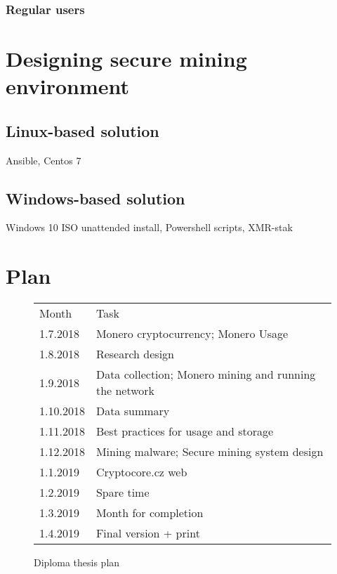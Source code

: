 \documentclass[
  printed, %
  table,   %
  nolof,     %
  nolot,     %
           oneside, color
]{fithesis3}
\begin{document}
\subsection{Regular users}


\chapter{Designing secure mining environment}
\section{Linux-based solution}
Ansible, Centos 7
\section{Windows-based solution}
Windows 10 ISO unattended install, Powershell scripts, XMR-stak

\chapter{Plan}

\begin{figure}[H]
\center
\begin{tabular}{ll}
Month     & Task                                              \\
1.7.2018  & Monero cryptocurrency; Monero Usage              \\
1.8.2018  & Research design  \\
1.9.2018  & Data collection; Monero mining and running the network \\
1.10.2018 & Data summary                                   \\
1.11.2018 & Best practices for usage and storage                \\
1.12.2018 & Mining malware; Secure mining system design     \\
1.1.2019  & Cryptocore.cz web            \\
1.2.2019  & Spare time                                           \\
1.3.2019  & Month for completion                                 \\
1.4.2019  & Final version + print                            
\end{tabular}
\caption{Diploma thesis plan}
\label{ssme-thesis-plan}
\end{figure}



\printbibliography[heading=bibintoc]

\appendix %
\end{document}
